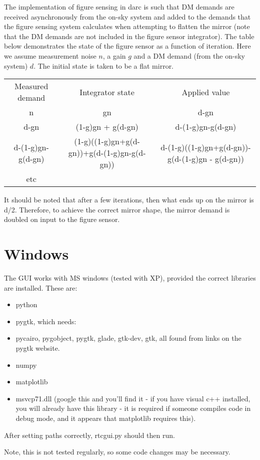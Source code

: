 \documentclass[a4,10pt]{article}
\begin{document}
The implementation of figure sensing in darc is such that DM demands
are received asynchronously from the on-sky system and added to the
demands that the figure sensing system calculates when attempting to
flatten the mirror (note that the DM demands are not included in the
figure sensor integrator).  The table below demonstrates the state of
the figure sensor as a function of iteration.  Here we assume
measurement noise $n$, a gain $g$ and a DM demand (from the on-sky
system) $d$.  The initial state is taken to be a flat mirror.

\begin{tabular}{ccc}
Measured demand & Integrator state & Applied value \\
n & gn & d-gn\\
d-gn & (1-g)gn + g(d-gn) & d-(1-g)gn-g(d-gn)\\
d-(1-g)gn-g(d-gn) & (1-g)((1-g)gn+g(d-gn))+g(d-(1-g)gn-g(d-gn)) & d-(1-g)((1-g)gn+g(d-gn))-g(d-(1-g)gn - g(d-gn))\\
etc &&\\
\end{tabular}

It should be noted that after a few iterations, then what ends up on
the mirror is d/2.  Therefore, to achieve the correct mirror shape,
the mirror demand is doubled on input to the figure sensor.

\section{Windows}
The GUI works with MS windows (tested with XP), provided the
correct libraries are installed.  These are:
\begin{itemize}
\item python
\item pygtk, which needs:
\item pycairo, pygobject, pygtk, glade, gtk-dev, gtk, all found from links
on the pygtk website.
\item numpy
\item matplotlib
\item msvcp71.dll (google this and you'll find it - if you have visual c++
installed, you will already have this library - it is required if
someone compiles code in debug mode, and it appears that matplotlib
requires this).
\end{itemize}
After setting paths correctly, rtcgui.py should then run.

Note, this is not tested regularly, so some code changes may
be necessary.
\end{document}
